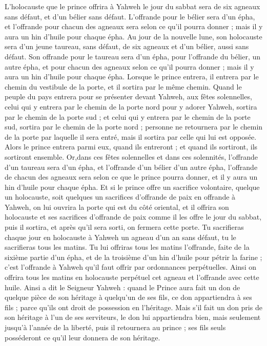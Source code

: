 \begin{multicols}{2}
L'holocauste que le prince offrira à Yahweh le jour du sabbat sera de six agneaux sans défaut, et d'un bélier sans défaut.
L'offrande pour le bélier sera d'un épha, et l'offrande pour chacun des agneaux sera selon ce qu'il pourra donner ; mais il y aura un hin d'huile pour chaque épha.
Au jour de la nouvelle lune, son holocauste sera d'un jeune taureau, sans défaut, de six agneaux et d'un bélier, aussi sans défaut.
Son offrande pour le taureau sera d'un épha, pour l'offrande du bélier, un autre épha, et pour chacun des agneaux selon ce qu'il pourra donner ; mais il y aura un hin d'huile pour chaque épha.
Lorsque le prince entrera, il entrera par le chemin du vestibule de la porte, et il sortira par le même chemin.
Quand le peuple du pays entrera pour se présenter devant Yahweh, aux fêtes solennelles, celui qui y entrera par le chemin de la porte nord pour y adorer Yahweh, sortira par le chemin de la porte sud ; et celui qui y entrera par le chemin de la porte sud, sortira par le chemin de la porte nord ; personne ne retournera par le chemin de la porte par laquelle il sera entré, mais il sortira par celle qui lui est opposée.
Alors le prince entrera parmi eux, quand ils entreront ; et quand ils sortiront, ils sortiront ensemble.
Or,dans ces fêtes solennelles et dans ces solennités, l'offrande d'un taureau sera d'un épha, et l'offrande d'un bélier d'un autre épha, l'offrande de chacun des agneaux sera selon ce que le prince pourra donner, et il y aura un hin d'huile pour chaque épha.
Et si le prince offre un sacrifice volontaire, quelque un holocauste, soit quelques un sacrifices d'offrande de paix en offrande à Yahweh, on lui ouvrira la porte qui est du côté oriental, et il offrira son holocauste et ses sacrifices d'offrande de paix comme il les offre le jour du sabbat, puis il sortira, et après qu'il sera sorti, on fermera cette porte.
Tu sacrifieras chaque jour en holocauste à Yahweh un agneau d'un an sans défaut, tu le sacrifieras tous les matins.
Tu lui offriras tous les matins l'offrande, faite de la sixième partie d'un épha, et de la troisième d'un hin d'huile pour pétrir la farine ; c'est l'offrande à Yahweh qu'il faut offrir par ordonnances perpétuelles.
Ainsi on offrira tous les matins en holocauste perpétuel cet agneau et l'offrande avec cette huile.
Ainsi a dit le Seigneur Yahweh : quand le Prince aura fait un don de quelque pièce de son héritage à quelqu'un de ses fils, ce don appartiendra à ses fils ; parce qu'ils ont droit de possession en l'héritage.
Mais s'il fait un don pris de son héritage à l'un de ses serviteurs, le don lui appartiendra bien, mais seulement jusqu'à l'année de la liberté, puis il retournera au prince ; ses fils seuls posséderont ce qu'il leur donnera de son héritage.

\end{multicols}
